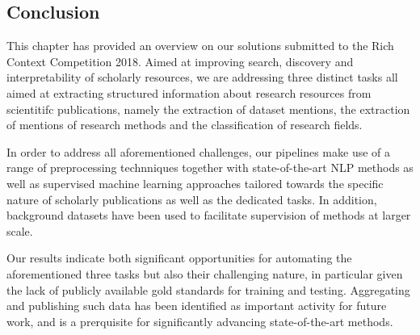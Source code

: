 \subsection{Conclusion}
\label{sec:conclusion}
This chapter has provided an overview on our solutions submitted to the Rich Context Competition 2018. Aimed at improving search, discovery and interpretability of scholarly resources, we are addressing three distinct tasks all aimed at extracting structured information about research resources from scientitifc publications, namely the extraction of dataset mentions, the extraction of mentions of research methods and the classification of research fields. 

In order to address all aforementioned challenges, our pipelines make use of a range of preprocessing technniques together with state-of-the-art NLP methods as well as supervised machine learning approaches tailored towards the specific nature of scholarly publications as well as the dedicated tasks. In addition, background datasets have been used to facilitate supervision of methods at larger scale.

Our results indicate both significant opportunities for automating the aforementioned three tasks but also their challenging nature, in particular given the lack of publicly available gold standards for training and testing. Aggregating and publishing such data has been identified as important activity for future work, and is a prerquisite for significantly advancing state-of-the-art methods.

